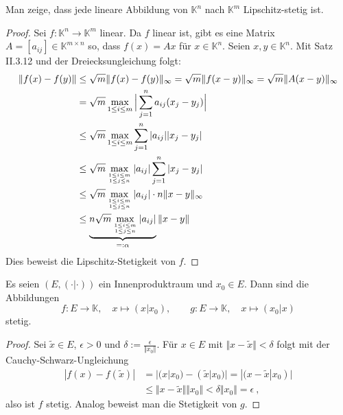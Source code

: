 
\begin{aufgabe}
	Man zeige, dass jede lineare Abbildung von $\mathbb K^n$ nach $\mathbb K^m$
	Lipschitz-stetig ist.
\end{aufgabe}
\begin{proof}
	Sei $f: \mathbb K^n \to \mathbb K^m$ linear. Da $f$ linear ist, gibt es eine
	Matrix $A = [a_{ij}] \in \mathbb K^{m \times n}$ so, dass $f(x) = A x$ für $x \in \mathbb K^n$.
	Seien $x, y \in \mathbb K^n$. Mit Satz II.3.12 und der Dreiecksungleichung folgt:
	\begin{align*}
		\Vert f(x) - f(y) \Vert
			&\leq \sqrt m \Vert f(x) - f(y) \Vert_\infty
			= \sqrt m \Vert f(x-y) \Vert_\infty 
			= \sqrt m \Vert A(x-y) \Vert_\infty \\
			&= \sqrt m \max_{1 \leq i \leq m} \Big \vert \sum_{j=1}^n a_{ij} (x_j - y_j) \Big \vert \\
			&\leq \sqrt m \max_{1 \leq i \leq m} \sum_{j=1}^n |a_{ij}| | x_j - y_j | \\
			&\leq \sqrt m \max_{1 \leq i \leq m \atop 1 \leq j \leq n} | a_{ij}| \sum_{j=1}^n |x_j - y_j| \\
			&\leq \sqrt m \max_{1 \leq i \leq m \atop 1 \leq j \leq n} |a_{ij}|\cdot  n \Vert x - y \Vert_\infty \\
			&\leq \underbrace{n \sqrt m \max_{1 \leq i \leq m \atop 1 \leq j \leq n} |a_{ij}| }_{=: \alpha} \Vert x -y \Vert
	\end{align*}
	Dies beweist die Lipschitz-Stetigkeit von $f$.
\end{proof}

\setcounter{aufgabe}{13}
\begin{aufgabe}
	Es seien $(E, (\cdot | \cdot) )$ ein Innenproduktraum und $x_0 \in E$. Dann sind die Abbildungen
	\[
		f: E \to \mathbb K, \quad x \mapsto (x | x_0), \qquad
		g: E \to \mathbb K, \quad x \mapsto (x_0 | x)
	\]
	stetig.
\end{aufgabe}
\begin{proof}
	Sei $\tilde x \in E$, $\epsilon > 0$ und $\delta := \frac{\epsilon}{\Vert x_0 \Vert}$. Für
	$x \in E$ mit $\Vert x - \tilde x \Vert < \delta$ folgt mit der Cauchy-Schwarz-Ungleichung
	\begin{align*}
		| f(x) - f(\tilde x) | 
			&= | (x | x_0) - (\tilde x | x_0) |
			= |(x-\tilde x | x_0) | \\
			&\leq \Vert x - \tilde x \Vert \Vert x_0 \Vert < \delta \Vert x_0 \Vert = \epsilon \ ,
	\end{align*}
	also ist $f$ stetig.
	Analog beweist man die Stetigkeit von $g$.
\end{proof}

